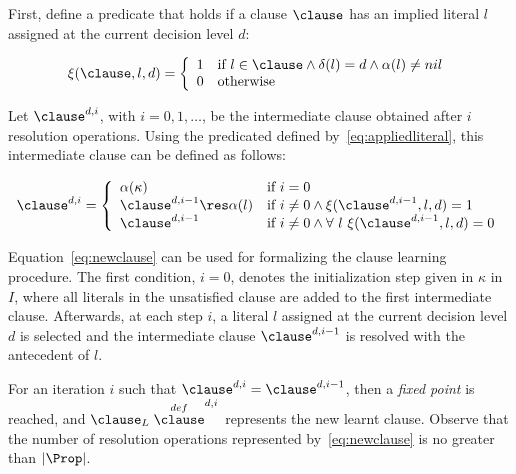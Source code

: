 \begin{definition}%
\label{def:clauselearning}
    First, define a predicate that holds if a clause $\clause$ has an implied
    literal $l$ assigned at the current decision level $d$:

    \begin{equation}%
        \label{eq:appliedliteral}
        \xi(\clause, l, d) = 
        \left\{
            \begin{array}{ll}
                1 & \text{if $l \in \clause \land \delta(l) = d \land \alpha(l) \neq nil$} \\
                0 & \text{otherwise}
            \end{array}
        \right.
    \end{equation}

    Let $\clause^{d, i}$, with $i = 0, 1, \ldots$, be the intermediate clause
    obtained after $i$ resolution operations. Using the predicated defined
    by~\ref{eq:appliedliteral}, this intermediate clause can be defined as
    follows:

    \begin{equation}%
        \label{eq:newclause}
        \clause^{d,i} = 
        \left\{
            \begin{array}{ll}
                \alpha(\kappa) & \text{if $i=0$}\\
                \clause^{d,i-1} \res \alpha(l) & \text{if $i \neq 0 \land \xi(\clause^{d,i-1}, l, d) = 1$}\\
                \clause^{d, i-1} & \text{if $i \neq 0 \land \forall~l~\xi(\clause^{d, i-1}, l, d) = 0$}
            \end{array}
        \right.
    \end{equation}
\end{definition}

Equation~\ref{eq:newclause} can be used for formalizing the clause learning
procedure. The first condition, $i = 0$, denotes the initialization step given
in $\kappa$ in $I$, where all literals in the unsatisfied clause are added to
the first intermediate clause. Afterwards, at each step $i$, a literal $l$
assigned at the current decision level $d$ is selected and the intermediate
clause $\clause^{d, i-1}$ is resolved with the antecedent of $l$.

For an iteration $i$ such that $\clause^{d, i} = \clause^{d, i-1}$, then a
\emph{fixed point} is reached, and $\clause_L \stackrel{def} \clause^{d, i}$
represents the new learnt clause. Observe that the number of resolution
operations represented by~\ref{eq:newclause} is no greater than $|\Prop|$.

